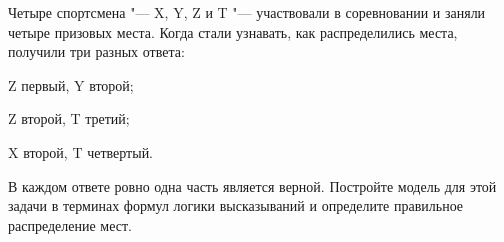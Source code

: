 \begin{problemList}
		\bigskip
		
		{Четыре спортсмена "--- X, Y, Z и T "--- участвовали в соревновании и заняли четыре призовых места. Когда стали узнавать, как распределились места, получили три разных ответа:
		\begin{russianEnumerate}
			\item Z первый, Y второй;			
			\item Z второй, T третий;
			\item X второй, T четвертый.
		\end{russianEnumerate}
		В каждом ответе ровно одна часть является верной. Постройте модель для этой задачи в терминах формул логики высказываний и определите правильное распределение мест.}
	
		\bigskip
		

\end{problemList}

